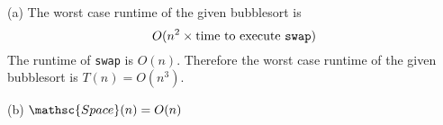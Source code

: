
(a)
The worst case runtime of the given bubblesort is
\[
O(n^2 \times \text{time to execute \texttt{swap}})
\]
The runtime of \verb!swap! is $O(n)$.
Therefore the worst case runtime of the given bubblesort is
$T(n) = O(n^3)$.

(b)
$\mathsc{Space}(n) = O(n)$
